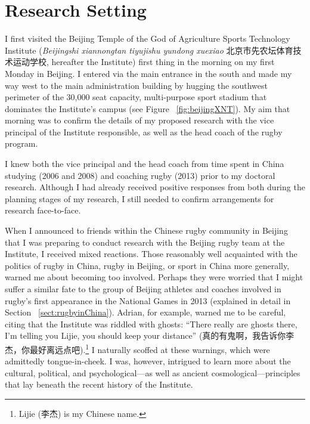 
\begin{savequote}[8cm]

  \qauthor{}
\end{savequote}


\chapter{\label{chap:researchSetting}Research Setting}


\minitoc




                                          \begin{CJK}{UTF8}{gbsn}


I first visited the Beijing Temple of the God of Agriculture Sports Technology Institute (\textit{Beijingshi xiannongtan tiyujishu yundong xuexiao} 北京市先农坛体育技术运动学校,
hereafter the Institute) first thing in the morning on my first Monday in Beijing.  I entered via the main entrance in the south and made my way west to the main administration building by hugging the southwest perimeter of the 30,000 seat capacity, multi-purpose sport stadium that dominates the Institute's campus (see Figure ~\ref{fig:beijingXNT}). My aim that morning was to confirm the details of my proposed research with the vice principal of the Institute responsible, as well as the head coach of the rugby program.

I knew both the vice principal and the head coach from time spent in China studying (2006 and 2008) and coaching rugby (2013) prior to my doctoral research.  Although I had already received positive responses from both during the planning stages of my research, I still needed to confirm arrangements for research face-to-face.

When I announced to friends within the Chinese rugby community in Beijing that I was preparing to conduct research with the Beijing rugby team at the Institute, I received mixed reactions.  Those reasonably well acquainted with the politics of rugby in China, rugby in Beijing, or sport in China more generally, warned me about becoming too involved.  Perhaps they were worried that I might suffer a similar fate to the group of Beijing athletes and coaches involved in rugby's first appearance in the National Games in 2013 (explained in detail in Section ~\ref{sect:rugbyinChina}).  Adrian, for example, warned me to be careful, citing that the Institute was riddled with ghosts: ``There really are ghosts there, I'm telling you Lijie, you should keep your distance'' (真的有鬼啊，我告诉你李杰，你最好离远点吧).\footnote{Lijie (李杰) is my Chinese name.}  I naturally scoffed at these warnings, which were admittedly tongue-in-cheek.  I was, however, intrigued to learn more about the cultural, political, and psychological---as well as ancient cosmological---principles that lay beneath the recent history of the Institute.


\end{CJK}
